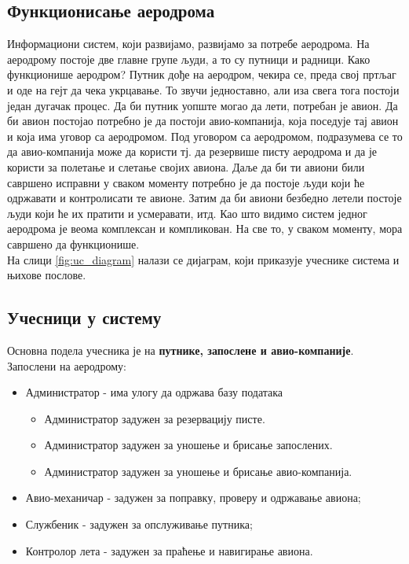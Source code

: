 \documentclass{article}
\begin{document}
\subsection{Функционисање аеродрома}
Информациони систем, који развијамо, развијамо за потребе аеродрома. На аеродрому постоје две главне групе људи, а то су путници и радници. Како функционише аеродром? Путник дође на аеродром, чекира се, преда свој пртљаг и оде на гејт да чека укрцавање. То звучи једноставно, али иза свега тога постоји један дугачак процес. Да би путник уопште могао да лети, потребан је авион. Да би авион постојао потребно је да постоји авио-компанија, која поседује тај авион и која има уговор са аеродромом. Под уговором са аеродромом, подразумева се то да авио-компанија може да користи тј. да резервише писту аеродрома и да је користи за полетање и слетање својих авиона. Даље да би ти авиони били савршено исправни у сваком моменту потребно је да постоје људи који ће одржавати и контролисати те авионе. Затим да би авиони безбедно летели постоје људи који ће их пратити и усмеравати, итд. Као што видимо систем једног аеродрома је веома комплексан и компликован. На све то, у сваком моменту, мора савршено да функционише. \\
    На слици \ref{fig:uc_diagram} налази се дијаграм, који приказује учеснике система и њихове послове.

\subsection{Учесници у систему}
Основна подела учесника је на \textbf{путнике, запослене и авио-компаније}.\\
Запослени на аеродрому:
\begin{itemize}
    \item Администратор - има улогу да одржава базу података
        \begin{itemize}
            \item Администратор задужен за резервацију писте.
            \item Администратор задужен за уношење и брисање запослених.
            \item Администратор задужен за уношење и брисање авио-компанија.
        \end{itemize}
    \item Авио-механичар - задужен за поправку, проверу и одржавање авиона;
    \item Службеник - задужен за опслуживање путника;
    \item Контролор лета - задужен за праћење и навигирање авиона.
\end{itemize}
\end{document}
